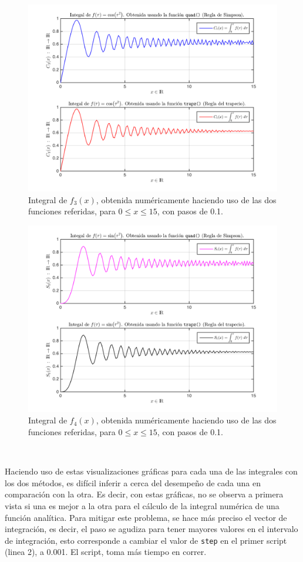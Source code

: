 \documentclass[11pt, spanish]{article}
\begin{document}
\begin{figure}[H]
\centering
	\includegraphics[scale=0.6]{data/img/f3intplot01}
	\caption{Integral de $f_3(x)$, obtenida numéricamente haciendo uso de las dos funciones referidas, para $0 \leq x \leq 15$, con pasos de 0.1.}
\end{figure}

\begin{figure}[H]
\centering
	\includegraphics[scale=0.8]{data/img/f4intplot01}
	\caption{Integral de $f_4(x)$, obtenida numéricamente haciendo uso de las dos funciones referidas, para $0 \leq x \leq 15$, con pasos de 0.1.}
\end{figure}\

Haciendo uso de estas visualizaciones gráficas para cada una de las integrales con los dos métodos, es difícil inferir a cerca del desempeño de cada una en comparación con la otra. Es decir, con estas gráficas, no se observa a primera vista si una es mejor a la otra para el cálculo de la integral numérica de una función analítica. Para mitigar este problema, se hace más preciso el vector de integración, es decir, el paso se agudiza para tener mayores valores en el intervalo de integración, esto corresponde a cambiar el valor de \texttt{step} en el primer script (linea 2), a 0.001. El script, toma más tiempo en correr. \\
\end{document}
